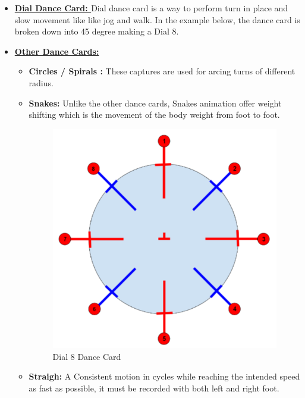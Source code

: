 \documentclass[12pt]{book}
\begin{document}
\begin{itemize}
\begin{figure}[!h]
              \label{Rectangle Dance Card [Zadziuk 2016]}
          \end{figure}
    \item  \textbf{\underline{Dial Dance Card: }}
          Dial dance card is a way to perform turn in place and slow movement like like jog and walk.
          In the example below, the dance card is broken down into 45 degree making a Dial 8.
    \item \textbf{\underline{Other Dance Cards:}}
          \begin{itemize}
              \item \textbf{Circles / Spirals :} These captures are used for arcing turns of different radius.
              \item \textbf{Snakes: } Unlike the other dance cards, Snakes animation offer weight shifting which is
              the movement of the body weight from foot to foot.\\
              \begin{figure}[!h]
                \centering
                \includegraphics[scale=0.4]{./Figures/Images/DialDanceCard.jpg}
                \caption{Dial 8 Dance Card}
                \label{Dial 8 Dance Card}
              \end{figure}
              \item  \textbf{Straigh: }A Consistent motion in cycles while reaching the intended speed as fast as
possible, it must be recorded with both left and right foot.
          \end{itemize}
\end{itemize}
\end{document}
